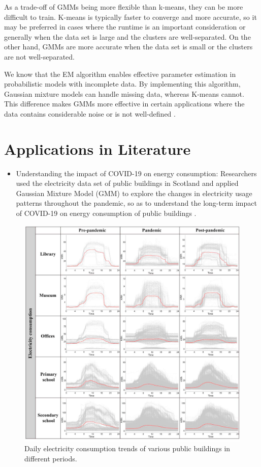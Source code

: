 \documentclass[12pt]{article}
\providecommand{\tightlist}{%
  \setlength{\itemsep}{0pt}\setlength{\parskip}{0pt}}
\begin{document}
As a trade-off of GMMs being more flexible than k-means, they can be
more difficult to train. K-means is typically faster to converge and
more accurate, so it may be preferred in cases where the runtime is an
important consideration or generally when the data set is large and the
clusters are well-separated. On the other hand, GMMs are more accurate
when the data set is small or the clusters are not well-separated.

We know that the EM algorithm enables effective parameter estimation in
probabilistic models with incomplete data. By implementing this
algorithm, Gaussian mixture models can handle missing data, whereas
K-means cannot. This difference makes GMMs more effective in certain
applications where the data contains considerable noise or is not
well-defined \citep{kumar2022gaussian}.

\hypertarget{applications-in-literature}{%
\section{Applications in Literature}\label{applications-in-literature}}

\label{sec:examples}

\begin{itemize}
\tightlist
\item
  Understanding the impact of COVID-19 on energy consumption:
  Researchers used the electricity data set of public buildings in
  Scotland and applied Gaussian Mixture Model (GMM) to explore the
  changes in electricity usage patterns throughout the pandemic, so as
  to understand the long-term impact of COVID-19 on energy consumption
  of public buildings \citep{huang2023gaussian}.
\end{itemize}

\begin{figure}
\centering
\includegraphics{1.jpg}
\caption{Daily electricity consumption trends of various public
buildings in different periods.}
\end{figure}
\end{document}
